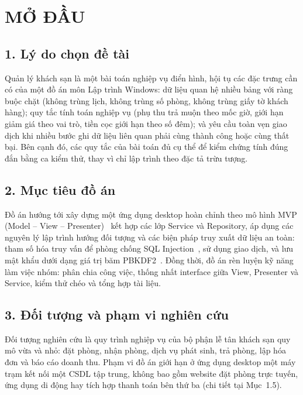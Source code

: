 \documentclass[14pt]{report}
\newcommand{\TieuDeDau}[1]{\markboth{#1}{#1}}
\begin{document}
\clearpage
{}

\chapter*{MỞ ĐẦU}
\TieuDeDau{MỞ ĐẦU}
\section*{1. Lý do chọn đề tài}

Quản lý khách sạn là một bài toán nghiệp vụ điển hình, hội tụ các đặc trưng cần có của một đồ án môn Lập trình Windows: dữ liệu quan hệ nhiều bảng với ràng buộc chặt (không trùng lịch, không trùng số phòng, không trùng giấy tờ khách hàng); quy tắc tính toán nghiệp vụ (phụ thu trả muộn theo mốc giờ, giới hạn giảm giá theo vai trò, tiền cọc giới hạn theo số đêm); và yêu cầu toàn vẹn giao dịch khi nhiều bước ghi dữ liệu liên quan phải cùng thành công hoặc cùng thất bại. Bên cạnh đó, các quy tắc của bài toán đủ cụ thể để kiểm chứng tính đúng đắn bằng ca kiểm thử, thay vì chỉ lập trình theo đặc tả trừu tượng.

\section*{2. Mục tiêu đồ án}

Đồ án hướng tới xây dựng một ứng dụng desktop hoàn chỉnh theo mô hình MVP (Model -- View -- Presenter)~\cite{potel,fowler} kết hợp các lớp Service và Repository, áp dụng các nguyên lý lập trình hướng đối tượng và các biện pháp truy xuất dữ liệu an toàn: tham số hóa truy vấn để phòng chống SQL Injection~\cite{owasp-sqli}, sử dụng giao dịch, và lưu mật khẩu dưới dạng giá trị băm PBKDF2~\cite{rfc8018}. Đồng thời, đồ án rèn luyện kỹ năng làm việc nhóm: phân chia công việc, thống nhất interface giữa View, Presenter và Service, kiểm thử chéo và tổng hợp tài liệu.

\section*{3. Đối tượng và phạm vi nghiên cứu}

Đối tượng nghiên cứu là quy trình nghiệp vụ của bộ phận lễ tân khách sạn quy mô vừa và nhỏ: đặt phòng, nhận phòng, dịch vụ phát sinh, trả phòng, lập hóa đơn và báo cáo doanh thu. Phạm vi đồ án giới hạn ở ứng dụng desktop một máy trạm kết nối một CSDL tập trung, không bao gồm website đặt phòng trực tuyến, ứng dụng di động hay tích hợp thanh toán bên thứ ba (chi tiết tại Mục~1.5).
\end{document}
